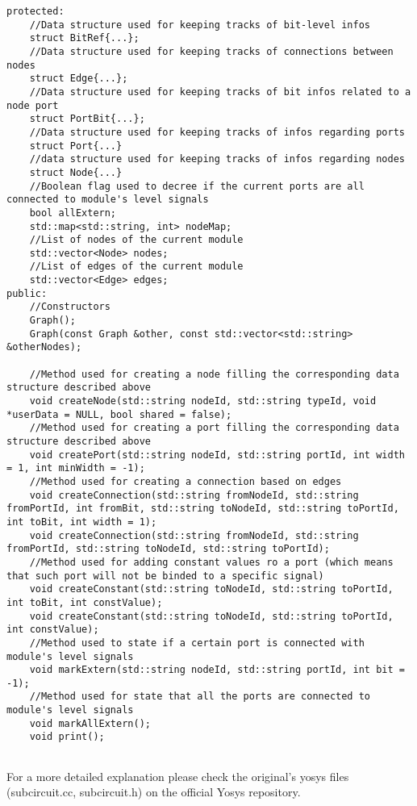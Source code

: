\documentclass{article}
\begin{document}
\begin{mdframed}[hidealllines=true, backgroundcolor=magenta!10]
	\begin{lstlisting}[basicstyle=\tiny]
protected:
	//Data structure used for keeping tracks of bit-level infos
	struct BitRef{...};
	//Data structure used for keeping tracks of connections between nodes
	struct Edge{...};
	//Data structure used for keeping tracks of bit infos related to a node port
	struct PortBit{...};
	//Data structure used for keeping tracks of infos regarding ports 
	struct Port{...}
	//data structure used for keeping tracks of infos regarding nodes
	struct Node{...}
	//Boolean flag used to decree if the current ports are all connected to module's level signals
	bool allExtern;
	std::map<std::string, int> nodeMap;
	//List of nodes of the current module
	std::vector<Node> nodes;
	//List of edges of the current module
	std::vector<Edge> edges;
public:
	//Constructors
	Graph();
	Graph(const Graph &other, const std::vector<std::string> &otherNodes);
	
	//Method used for creating a node filling the corresponding data structure described above
	void createNode(std::string nodeId, std::string typeId, void *userData = NULL, bool shared = false);
	//Method used for creating a port filling the corresponding data structure described above
	void createPort(std::string nodeId, std::string portId, int width = 1, int minWidth = -1);
	//Method used for creating a connection based on edges
	void createConnection(std::string fromNodeId, std::string fromPortId, int fromBit, std::string toNodeId, std::string toPortId, int toBit, int width = 1);
	void createConnection(std::string fromNodeId, std::string fromPortId, std::string toNodeId, std::string toPortId);
	//Method used for adding constant values ro a port (which means that such port will not be binded to a specific signal)
	void createConstant(std::string toNodeId, std::string toPortId, int toBit, int constValue);
	void createConstant(std::string toNodeId, std::string toPortId, int constValue);
	//Method used to state if a certain port is connected with module's level signals
	void markExtern(std::string nodeId, std::string portId, int bit = -1);
	//Method used for state that all the ports are connected to module's level signals
	void markAllExtern();
	void print();
	
	\end{lstlisting}
\end{mdframed}


For a more detailed explanation please check the original's yosys files (subcircuit.cc, subcircuit.h) on the official Yosys repository.\\
\end{document}
